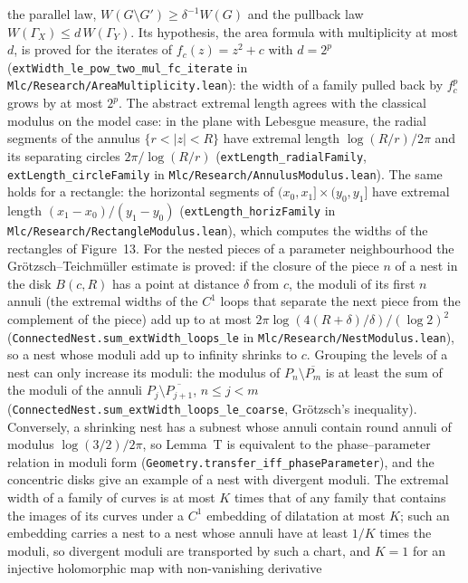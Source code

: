 \documentclass[11pt,a4paper]{article}
\begin{document}
the parallel law, \(W(G\setminus G')\ge\delta^{-1}W(G)\) and the pullback law
\(W(\Gamma_X)\le d\,W(\Gamma_Y)\). Its hypothesis, the area formula with multiplicity at most
\(d\), is proved for the iterates of \(f_c(z)=z^2+c\) with \(d=2^p\)
(\texttt{extWidth\_le\_pow\_two\_mul\_fc\_iterate} in \texttt{Mlc/Research/AreaMultiplicity.lean}):
the width of a family pulled back by \(f_c^p\) grows by at most \(2^p\). The abstract extremal length agrees with the classical
modulus on the model case: in the plane with Lebesgue measure, the radial segments of the
annulus \(\{r<|z|<R\}\) have extremal length \(\log(R/r)/2\pi\) and its separating circles
\(2\pi/\log(R/r)\) (\texttt{extLength\_radialFamily}, \texttt{extLength\_circleFamily} in
\texttt{Mlc/Research/AnnulusModulus.lean}). The same holds for a rectangle: the horizontal
segments of \((x_0,x_1]\times(y_0,y_1]\) have extremal length \((x_1-x_0)/(y_1-y_0)\)
(\texttt{extLength\_horizFamily} in \texttt{Mlc/Research/RectangleModulus.lean}), which
computes the widths of the rectangles of Figure~13. For the nested pieces of a
parameter neighbourhood the Gr\"otzsch--Teichm\"uller estimate is proved: if the closure of
the piece \(n\) of a nest in the disk \(B(c,R)\) has a point at distance \(\delta\) from \(c\),
the moduli of its first \(n\) annuli (the extremal widths of the \(C^1\) loops that separate the
next piece from the complement of the piece) add up to at most \(2\pi\log(4(R+\delta)/\delta)/(\log 2)^2\)
(\texttt{ConnectedNest.sum\_extWidth\_loops\_le} in \texttt{Mlc/Research/NestModulus.lean}),
so a nest whose moduli add up to infinity shrinks to \(c\). Grouping the levels of a nest can
only increase its moduli: the modulus of \(P_n\setminus\overline{P_m}\) is at least the sum of
the moduli of the annuli \(P_j\setminus\overline{P_{j+1}}\), \(n\le j<m\)
(\texttt{ConnectedNest.sum\_extWidth\_loops\_le\_coarse}, Gr\"otzsch's inequality). Conversely, a shrinking nest has a
subnest whose annuli contain round annuli of modulus \(\log(3/2)/2\pi\), so Lemma~T is equivalent
to the phase--parameter relation in moduli form (\texttt{Geometry.transfer\_iff\_phaseParameter}),
and the concentric disks give an example of a nest with divergent moduli. The extremal width of a
family of curves is at most \(K\) times that of any family that contains the images of its curves
under a \(C^1\) embedding of dilatation at most \(K\); such an embedding carries a nest to a nest
whose annuli have at least \(1/K\) times the moduli, so divergent moduli are transported by such a
chart, and \(K=1\) for an injective holomorphic map with non-vanishing derivative
\end{document}
